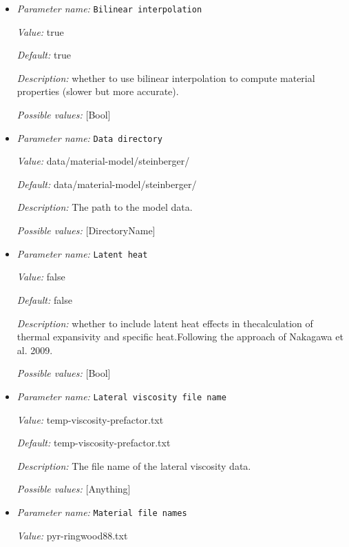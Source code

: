 \begin{itemize}
\item {\it Parameter name:} {\tt Bilinear interpolation}


{\it Value:} true


{\it Default:} true


{\it Description:} whether to use bilinear interpolation to compute material properties (slower but more accurate).


{\it Possible values:} [Bool]
\item {\it Parameter name:} {\tt Data directory}


{\it Value:} data/material-model/steinberger/


{\it Default:} data/material-model/steinberger/


{\it Description:} The path to the model data. 


{\it Possible values:} [DirectoryName]
\item {\it Parameter name:} {\tt Latent heat}


{\it Value:} false


{\it Default:} false


{\it Description:} whether to include latent heat effects in thecalculation of thermal expansivity and specific heat.Following the approach of Nakagawa et al. 2009.


{\it Possible values:} [Bool]
\item {\it Parameter name:} {\tt Lateral viscosity file name}


{\it Value:} temp-viscosity-prefactor.txt


{\it Default:} temp-viscosity-prefactor.txt


{\it Description:} The file name of the lateral viscosity data. 


{\it Possible values:} [Anything]
\item {\it Parameter name:} {\tt Material file names}


{\it Value:} pyr-ringwood88.txt



\end{itemize}
